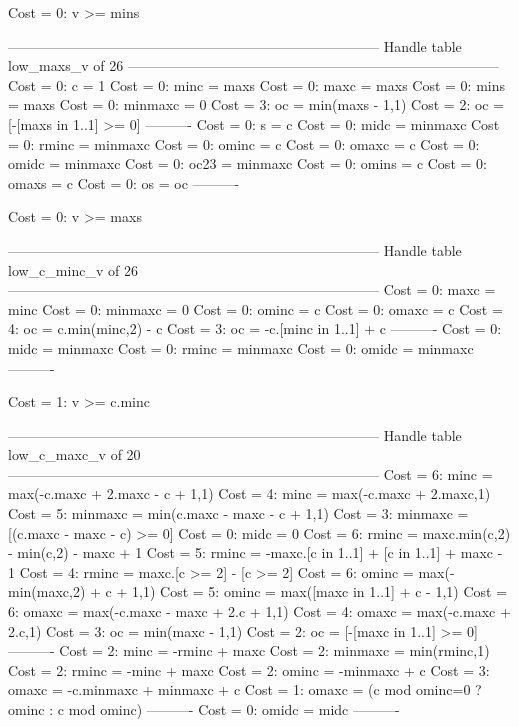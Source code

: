Cost =  0:  v >= mins

--------------------------------------------------------------------------------
Handle table low_maxs_v of 26
--------------------------------------------------------------------------------
Cost =  0:  c       = 1
Cost =  0:  minc    = maxs
Cost =  0:  maxc    = maxs
Cost =  0:  mins    = maxs
Cost =  0:  minmaxc = 0
Cost =  3:  oc      = min(maxs - 1,1)
Cost =  2:  oc      = [-[maxs in 1..1] >= 0]
----------
Cost =  0:  s       = c
Cost =  0:  midc    = minmaxc
Cost =  0:  rminc   = minmaxc
Cost =  0:  ominc   = c
Cost =  0:  omaxc   = c
Cost =  0:  omidc   = minmaxc
Cost =  0:  oc23    = minmaxc
Cost =  0:  omins   = c
Cost =  0:  omaxs   = c
Cost =  0:  os      = oc
----------

Cost =  0:  v >= maxs

--------------------------------------------------------------------------------
Handle table low_c_minc_v of 26
--------------------------------------------------------------------------------
Cost =  0:  maxc    = minc
Cost =  0:  minmaxc = 0
Cost =  0:  ominc   = c
Cost =  0:  omaxc   = c
Cost =  4:  oc      = c.min(minc,2) - c
Cost =  3:  oc      = -c.[minc in 1..1] + c
----------
Cost =  0:  midc    = minmaxc
Cost =  0:  rminc   = minmaxc
Cost =  0:  omidc   = minmaxc
----------

Cost =  1:  v >= c.minc

--------------------------------------------------------------------------------
Handle table low_c_maxc_v of 20
--------------------------------------------------------------------------------
Cost =  6:  minc    = max(-c.maxc + 2.maxc - c + 1,1)
Cost =  4:  minc    = max(-c.maxc + 2.maxc,1)
Cost =  5:  minmaxc = min(c.maxc - maxc - c + 1,1)
Cost =  3:  minmaxc = [(c.maxc - maxc - c) >= 0]
Cost =  0:  midc    = 0
Cost =  6:  rminc   = maxc.min(c,2) - min(c,2) - maxc + 1
Cost =  5:  rminc   = -maxc.[c in 1..1] + [c in 1..1] + maxc - 1
Cost =  4:  rminc   = maxc.[c >= 2] - [c >= 2]
Cost =  6:  ominc   = max(-min(maxc,2) + c + 1,1)
Cost =  5:  ominc   = max([maxc in 1..1] + c - 1,1)
Cost =  6:  omaxc   = max(-c.maxc - maxc + 2.c + 1,1)
Cost =  4:  omaxc   = max(-c.maxc + 2.c,1)
Cost =  3:  oc      = min(maxc - 1,1)
Cost =  2:  oc      = [-[maxc in 1..1] >= 0]
----------
Cost =  2:  minc    = -rminc + maxc
Cost =  2:  minmaxc = min(rminc,1)
Cost =  2:  rminc   = -minc + maxc
Cost =  2:  ominc   = -minmaxc + c
Cost =  3:  omaxc   = -c.minmaxc + minmaxc + c
Cost =  1:  omaxc   = (c mod ominc=0 ? ominc : c mod ominc)
----------
Cost =  0:  omidc   = midc
----------


